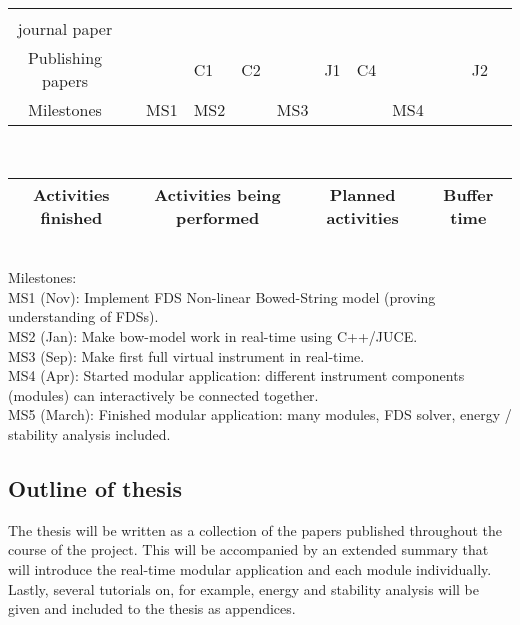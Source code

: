 \begin{tabular}{|c|p{\tabcolwidth}|p{\tabcolwidth}|p{\tabcolwidth}|p{\tabcolwidth}|p{\tabcolwidth}|p{\tabcolwidth}|p{\tabcolwidth}|p{\tabcolwidth}|p{\tabcolwidth}|p{\tabcolwidth}|p{\tabcolwidth}|p{\tabcolwidth}|}
      \cellcolor{lighterblue}\\
     journal paper & & \cellcolor{green} & \cellcolor{green} & \cellcolor{green} &\cellcolor{yellow} & & & & & & &
      \cellcolor{lighterblue}\\
     \hline 
     Publishing papers & & & \cellcolor{green}\centering C1 & \cellcolor{green}\centering C2 & & \cellcolor{lighterred} \centering J1 &\cellcolor{lighterred}\centering C4& & & & \cellcolor{lighterred} \centering J2 &  \cellcolor{lighterblue}
     \\
     \hline
     Milestones& & \centering MS1 \cellcolor{green} &\centering MS2 \cellcolor{green} & & MS3 \cellcolor{yellow} & & & \centering MS4 \cellcolor{lighterred} & & & & \cellcolor{lighterblue}
     \\
     \hline
\end{tabular}
\vspace{0.3cm}
\\
\begin{tabular}[h]{|c|c|c|c|}
\hline
\cellcolor{green} Activities finished & \cellcolor{yellow} Activities being performed & \cellcolor{lighterred} Planned activities & \cellcolor{lighterblue} Buffer time\\
\hline
\end{tabular}
\vspace{0.3cm}
\\
\normalsize
Milestones:
\\
MS1 (Nov): Implement FDS Non-linear Bowed-String model (proving understanding of FDSs).\\
MS2 (Jan): Make bow-model work in real-time using C++/JUCE.\\
MS3 (Sep): Make first full virtual instrument in real-time.\\
MS4 (Apr): Started modular application: different instrument components (modules) can interactively be connected together.\\
MS5 (March): Finished modular application: many modules, FDS solver, energy / stability analysis included. 

\subsection{Outline of thesis}
The thesis will be written as a collection of the papers published throughout the course of the project. This will be accompanied by an extended summary that will introduce the real-time modular application and each module individually. Lastly, several tutorials on, for example, energy and stability analysis will be given and included to the thesis as appendices. 

